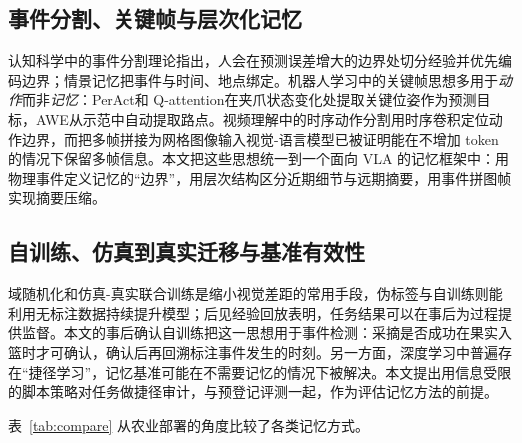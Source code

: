\subsection{事件分割、关键帧与层次化记忆}
认知科学中的事件分割理论\cite{zacks2007event}指出，人会在预测误差增大的边界处切分经验并优先编码边界；情景记忆把事件与时间、地点绑定\cite{tulving1972episodic,clayton1998episodic}。机器人学习中的关键帧思想多用于\emph{动作}而非\emph{记忆}：PerAct\cite{shridhar2022peract}和 Q-attention\cite{james2022qattention}在夹爪状态变化处提取关键位姿作为预测目标，AWE\cite{shi2023awe}从示范中自动提取路点。视频理解中的时序动作分割\cite{lea2017tcn,bai2018tcn}用时序卷积定位动作边界，而把多帧拼接为网格图像输入视觉-语言模型已被证明能在不增加 token 的情况下保留多帧信息\cite{kim2024imagegrid}。本文把这些思想统一到一个面向 VLA 的记忆框架中：用物理事件定义记忆的“边界”，用层次结构区分近期细节与远期摘要，用事件拼图帧实现摘要压缩。

\subsection{自训练、仿真到真实迁移与基准有效性}
域随机化\cite{tobin2017domain}和仿真-真实联合训练\cite{zhao2020sim2real}是缩小视觉差距的常用手段，伪标签与自训练\cite{lee2013pseudo,xie2020noisy}则能利用无标注数据持续提升模型；后见经验回放\cite{andrychowicz2017her}表明，任务结果可以在事后为过程提供监督。本文的事后确认自训练把这一思想用于事件检测：采摘是否成功在果实入篮时才可确认，确认后再回溯标注事件发生的时刻。另一方面，深度学习中普遍存在“捷径学习”\cite{geirhos2020shortcut}，记忆基准可能在不需要记忆的情况下被解决。本文提出用信息受限的脚本策略对任务做捷径审计，与预登记评测\cite{holm1979simple,schuirmann1987tost}一起，作为评估记忆方法的前提。

表~\ref{tab:compare} 从农业部署的角度比较了各类记忆方式。

